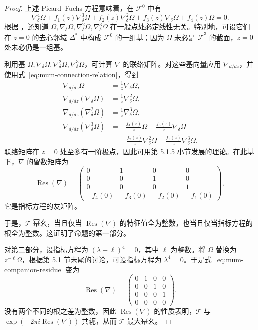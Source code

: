 \begin{proof}
上述 Picard--Fuchs 方程意味着，在 $\mathcal F^0$ 中有
\begin{equation}\label{eq:mum-connection-relation}
\nabla_\delta^4\Omega+f_1(z)\nabla_\delta^3\Omega
+f_2(z)\nabla_\delta^2\Omega+f_3(z)\nabla_\delta\Omega
+f_4(z)\Omega=0.
\end{equation}
根据 ，还知道 $\Omega,\nabla_\delta\Omega,\nabla_\delta^2\Omega,\nabla_\delta^3\Omega$ 在一般点处必定线性无关。特别地，可设它们在 $z=0$ 的去心邻域 $\Delta^*$ 中构成 $\mathcal F^0$ 的一组基；因为 $\Omega$ 未必是 $\overline{\mathcal F}^3$ 的截面，$z=0$ 处未必仍是一组基。

利用基 $\Omega,\nabla_\delta\Omega,\nabla_\delta^2\Omega,\nabla_\delta^3\Omega$，可计算 $\nabla$ 的联络矩阵。对这些基向量应用 $\nabla_{d/dz}$，并使用式~\eqref{eq:mum-connection-relation}，得到
\[
\begin{aligned}
\nabla_{d/dz}\Omega&=\frac1z\nabla_\delta\Omega,\\
\nabla_{d/dz}(\nabla_\delta\Omega)&=\frac1z\nabla_\delta^2\Omega,\\
\nabla_{d/dz}(\nabla_\delta^2\Omega)&=\frac1z\nabla_\delta^3\Omega,\\
\nabla_{d/dz}(\nabla_\delta^3\Omega)&=-\frac{f_4(z)}z\Omega
-\frac{f_3(z)}z\nabla_\delta\Omega\\
&\quad-\frac{f_2(z)}z\nabla_\delta^2\Omega
-\frac{f_1(z)}z\nabla_\delta^3\Omega.
\end{aligned}
\]
联络矩阵在 $z=0$ 处至多有一阶极点，因此可用\hyperref[subsec:monodromy-pf]{第 5.1.5 小节}发展的理论。在此基下，$\nabla$ 的留数矩阵为
\begin{equation}\label{eq:mum-companion-residue}
\operatorname{Res}(\nabla)=
\begin{pmatrix}
0&1&0&0\\
0&0&1&0\\
0&0&0&1\\
-f_4(0)&-f_3(0)&-f_2(0)&-f_1(0)
\end{pmatrix},
\end{equation}
它是指标方程的友矩阵。

于是，$\mathcal T$ 幂幺，当且仅当 $\operatorname{Res}(\nabla)$ 的特征值全为整数，也当且仅当指标方程的根全为整数。这证明了命题的第一部分。

对第二部分，设指标方程为 $(\lambda-\ell)^4=0$，其中 $\ell$ 为整数。将 $\Omega$ 替换为 $z^{-\ell}\Omega$，根据\hyperref[sec:hodge-theory]{第 5.1 节}末尾的讨论，可设指标方程为 $\lambda^4=0$。于是式~\eqref{eq:mum-companion-residue} 变为
\[
\operatorname{Res}(\nabla)=
\begin{pmatrix}
0&1&0&0\\
0&0&1&0\\
0&0&0&1\\
0&0&0&0
\end{pmatrix}.
\]
没有两个不同的根之差为整数，因此 $\operatorname{Res}(\nabla)$ 的性质表明，$\mathcal T$ 与 $\exp(-2\pi i\operatorname{Res}(\nabla))$ 共轭，从而 $\mathcal T$ 最大幂幺。


\end{proof}
